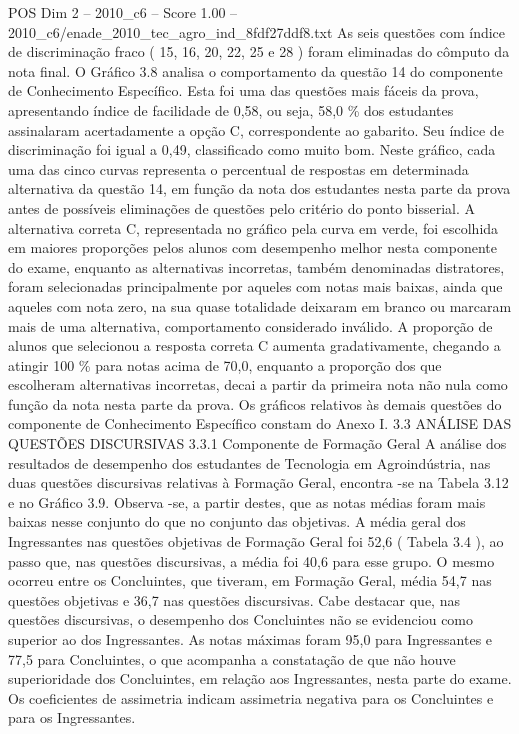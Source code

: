 \begin{textsample}{POS Dim 2 – 2010\_c6 – Score 1.00 – 2010\_c6/enade\_2010\_tec\_agro\_ind\_8fdf27ddf8.txt}
As seis questões com índice de discriminação fraco ( 15, 16, 20, 22, 25 e 28 ) foram eliminadas do cômputo da nota final.
O Gráfico 3.8 analisa o comportamento da questão 14 do componente de Conhecimento Específico.
Esta foi uma das questões mais fáceis da prova, apresentando índice de facilidade de 0,58, ou seja, 58,0 \% dos estudantes assinalaram acertadamente a opção C, correspondente ao gabarito.
Seu índice de discriminação foi igual a 0,49, classificado como muito bom.
Neste gráfico, cada uma das cinco curvas representa o percentual de respostas em determinada alternativa da questão 14, em função da nota dos estudantes nesta parte da prova antes de possíveis eliminações de questões pelo critério do ponto bisserial.
A alternativa correta C, representada no gráfico pela curva em verde, foi escolhida em maiores proporções pelos alunos com desempenho melhor nesta componente do exame, enquanto as alternativas incorretas, também denominadas distratores, foram selecionadas principalmente por aqueles com notas mais baixas, ainda que aqueles com nota zero, na sua quase totalidade deixaram em branco ou marcaram mais de uma alternativa, comportamento considerado inválido.
A proporção de alunos que selecionou a resposta correta C aumenta gradativamente, chegando a atingir 100 \% para notas acima de 70,0, enquanto a proporção dos que escolheram alternativas incorretas, decai a partir da primeira nota não nula como função da nota nesta parte da prova.
Os gráficos relativos às demais questões do componente de Conhecimento Específico constam do Anexo I. 3.3 ANÁLISE DAS QUESTÕES DISCURSIVAS 3.3.1 Componente de Formação Geral A análise dos resultados de desempenho dos estudantes de Tecnologia em Agroindústria, nas duas questões discursivas relativas à Formação Geral, encontra -se na Tabela 3.12 e no Gráfico 3.9.
Observa -se, a partir destes, que as notas médias foram mais baixas nesse conjunto do que no conjunto das objetivas.
A média geral dos Ingressantes nas questões objetivas de Formação Geral foi 52,6 ( Tabela 3.4 ), ao passo que, nas questões discursivas, a média foi 40,6 para esse grupo.
O mesmo ocorreu entre os Concluintes, que tiveram, em Formação Geral, média 54,7 nas questões objetivas e 36,7 nas questões discursivas.
Cabe destacar que, nas questões discursivas, o desempenho dos Concluintes não se evidenciou como superior ao dos Ingressantes.
As notas máximas foram 95,0 para Ingressantes e 77,5 para Concluintes, o que acompanha a constatação de que não houve superioridade dos Concluintes, em relação aos Ingressantes, nesta parte do exame.
Os coeficientes de assimetria indicam assimetria negativa para os Concluintes e para os Ingressantes.

\end{textsample}
